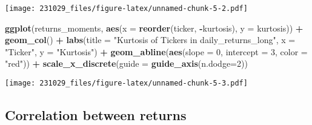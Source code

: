\documentclass[
]{article}
\newenvironment{Shaded}{\begin{snugshade}}{\end{snugshade}}
\newcommand{\AttributeTok}[1]{\textcolor[rgb]{0.13,0.29,0.53}{#1}}
\newcommand{\DecValTok}[1]{\textcolor[rgb]{0.00,0.00,0.81}{#1}}
\newcommand{\FunctionTok}[1]{\textcolor[rgb]{0.13,0.29,0.53}{\textbf{#1}}}
\newcommand{\NormalTok}[1]{#1}
\newcommand{\SpecialCharTok}[1]{\textcolor[rgb]{0.81,0.36,0.00}{\textbf{#1}}}
\newcommand{\StringTok}[1]{\textcolor[rgb]{0.31,0.60,0.02}{#1}}
\begin{document}
\texttt{[image: 231029\_files/figure-latex/unnamed-chunk-5-2.pdf]}

\begin{Shaded}
\begin{Highlighting}[]
\FunctionTok{ggplot}\NormalTok{(returns\_moments, }\FunctionTok{aes}\NormalTok{(}\AttributeTok{x =} \FunctionTok{reorder}\NormalTok{(ticker, }\SpecialCharTok{{-}}\NormalTok{kurtosis), }\AttributeTok{y =}\NormalTok{ kurtosis)) }\SpecialCharTok{+}
  \FunctionTok{geom\_col}\NormalTok{() }\SpecialCharTok{+}
  \FunctionTok{labs}\NormalTok{(}\AttributeTok{title =} \StringTok{"Kurtosis of Tickers in daily\_returns\_long"}\NormalTok{, }\AttributeTok{x =} \StringTok{"Ticker"}\NormalTok{, }\AttributeTok{y =} \StringTok{"Kurtosis"}\NormalTok{) }\SpecialCharTok{+}
  \FunctionTok{geom\_abline}\NormalTok{(}\FunctionTok{aes}\NormalTok{(}\AttributeTok{slope =} \DecValTok{0}\NormalTok{, }\AttributeTok{intercept =} \DecValTok{3}\NormalTok{, }\AttributeTok{color =} \StringTok{"red"}\NormalTok{)) }\SpecialCharTok{+}
  \FunctionTok{scale\_x\_discrete}\NormalTok{(}\AttributeTok{guide =} \FunctionTok{guide\_axis}\NormalTok{(}\AttributeTok{n.dodge=}\DecValTok{2}\NormalTok{))}
\end{Highlighting}
\end{Shaded}

\texttt{[image: 231029\_files/figure-latex/unnamed-chunk-5-3.pdf]}

\hypertarget{correlation-between-returns}{%
\subsection{Correlation between
returns}\label{correlation-between-returns}}
\end{document}
